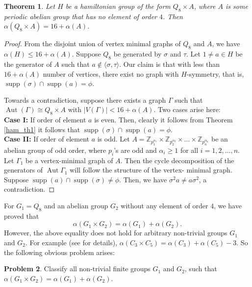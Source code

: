 \documentclass[12pt]{article}
\theoremstyle{plain}
\newtheorem{theorem}{Theorem}[section]
\theoremstyle{definition}
\newtheorem{problem}[theorem]{Problem}
\newcommand{\Aut}{\mathop{\mathrm{Aut}}}
\newcommand{\supp}{\mathop{\mathrm{supp}}}
\begin{document}
	
	\begin{theorem}
		\label{ham_main1}
		Let $H$ be a hamiltonian group of the form $Q_{8} \times A$, where $A$ is some periodic abelian group that has no element of order $4$. Then $\alpha(Q_{8} \times A) = 16 + \alpha(A)$.
	\end{theorem}	
	\begin{proof}
		From the disjoint union of vertex minimal graphs of $Q_{8}$ and $A$, we have $\alpha(H) \leq 16 + \alpha(A)$. Suppose $Q_{8}$ be generated by $\sigma$ and $\tau$. Let $1 \neq a \in H$ be the generator of $A$ such that $a \notin \langle \sigma, \tau \rangle$. Our claim is that with less than $16 +\alpha(A)$ number of vertices, there exist no graph with $H$-symmetry, that is, $\supp(\sigma) \cap \supp(a) = \phi$.\medskip
		
		
		Towards a contradiction, suppose there exists a graph $\Gamma$ such that $\Aut (\Gamma) \cong Q_{8} \times A$ with $|V(\Gamma)| < 16 + \alpha(A)$. Two cases arise here: \medskip\\		
		\textbf{Case I:} If order of element $a$ is even. Then, clearly it follows from Theorem \ref{ham_th1} it follows  that $\supp(\sigma) \cap \supp(a) = \phi$.\medskip\\
		\textbf{Case II:} If order of element $a$ is odd. Let $A = \mathbb{Z}_{p_{1}^{\alpha_{1}}} \times \mathbb{Z}_{p_{2}^{\alpha_{2}}} \times \ldots \times \mathbb{Z}_{p_{n}^{\alpha_{n}}} $ be an abelian group of odd order, where $p_{i}$'s are odd and $\alpha_{i} \geq 1$ for all $i = 1,2, \ldots, n$. Let $\Gamma_{1}$ be a vertex-minimal graph of $A$. Then the cycle decomposition of the generators of \(\Aut \Gamma_{1}\) will follow the structure of the vertex- minimal graph. Suppose $\supp(a) \cap \supp(\sigma) \neq \phi$. Then, we have $\sigma^{2} a \neq a \sigma^{2}$, a contradiction.
	\end{proof}
	
	For $G_1=Q_8$ and an abelian group $G_2$ without any element of order $4$, we have proved that  
	$$\alpha(G_{1} \times G_{2}) = \alpha(G_{1}) + \alpha(G_{2}).$$ 
	However, the above equality does not hold for arbitrary non-trivial groups $G_1$ and $G_2$. For example (see \cite{wca} for details), $\alpha(C_3\times C_5)=\alpha(C_3)+\alpha(C_5)-3$. So the following obvious problem arises:
	\begin{problem}
		Classify all non-trivial finite groups $G_1$ and $G_2$, such that $\alpha(G_{1} \times G_{2}) = \alpha(G_{1}) + \alpha(G_{2}).$
	\end{problem}
	
\end{document}
